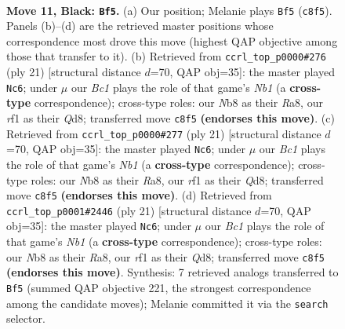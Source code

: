\documentclass[11pt]{article}
\begin{document}
\clearpage

\begin{figure}[p]\centering
\begin{subfigure}{0.46\textwidth}\centering
\resizebox{\linewidth}{!}{%
\newchessgame
\chessboard[
  setfen={rnb2rk1/ppp1bp1p/3q2p1/3pN3/3P3P/6P1/PP2PP2/RNBQ1RK1 b - - 0 11},
  showmover=false,
  pgfstyle=straightmove, color=movearrow, markmove={c8-f5}
]}
\caption{}
\end{subfigure}\hfill
\begin{subfigure}{0.46\textwidth}\centering
\resizebox{\linewidth}{!}{%
\newchessgame
\chessboard[
  setfen={rn1q1rk1/pp2ppbp/6p1/3pNb2/3P1B2/2P3P1/P3PPBP/R2Q1RK1 b - - 0 11},
  showmover=false,
  pgfstyle=straightmove, color=movearrow, markmove={b8-c6}
]}
\caption{}
\end{subfigure}
\\[4pt]
\begin{subfigure}{0.46\textwidth}\centering
\resizebox{\linewidth}{!}{%
\newchessgame
\chessboard[
  setfen={rn1q1rk1/pp2ppbp/6p1/3pNb2/3P1B2/2P3P1/P3PPBP/R2Q1RK1 b - - 0 11},
  showmover=false,
  pgfstyle=straightmove, color=movearrow, markmove={b8-c6}
]}
\caption{}
\end{subfigure}\hfill
\begin{subfigure}{0.46\textwidth}\centering
\resizebox{\linewidth}{!}{%
\newchessgame
\chessboard[
  setfen={rn1q1rk1/pp2ppbp/6p1/3pNb2/3P1B2/2P3P1/P3PPBP/R2Q1RK1 b - - 0 11},
  showmover=false,
  pgfstyle=straightmove, color=movearrow, markmove={b8-c6}
]}
\caption{}
\end{subfigure}
\caption{\textbf{Move 11, Black: \texttt{Bf5}.} (a) Our position; Melanie plays \texttt{Bf5} (\texttt{c8f5}). Panels (b)--(d) are the retrieved master positions whose correspondence most drove this move (highest QAP objective among those that transfer to it). (b) Retrieved from \texttt{ccrl\_top\_p0000\#276} (ply 21) [structural distance $d$=70, QAP obj=35]: the master played \texttt{Nc6}; under $\mu$ our \emph{Bc1} plays the role of that game's \emph{Nb1} (a \textbf{cross-type} correspondence); cross-type roles: our \emph{N}b8 as their \emph{R}a8, our \emph{r}f1 as their \emph{Q}d8; transferred move \texttt{c8f5} \textbf{(endorses this move)}. (c) Retrieved from \texttt{ccrl\_top\_p0000\#277} (ply 21) [structural distance $d$=70, QAP obj=35]: the master played \texttt{Nc6}; under $\mu$ our \emph{Bc1} plays the role of that game's \emph{Nb1} (a \textbf{cross-type} correspondence); cross-type roles: our \emph{N}b8 as their \emph{R}a8, our \emph{r}f1 as their \emph{Q}d8; transferred move \texttt{c8f5} \textbf{(endorses this move)}. (d) Retrieved from \texttt{ccrl\_top\_p0001\#2446} (ply 21) [structural distance $d$=70, QAP obj=35]: the master played \texttt{Nc6}; under $\mu$ our \emph{Bc1} plays the role of that game's \emph{Nb1} (a \textbf{cross-type} correspondence); cross-type roles: our \emph{N}b8 as their \emph{R}a8, our \emph{r}f1 as their \emph{Q}d8; transferred move \texttt{c8f5} \textbf{(endorses this move)}. Synthesis: 7 retrieved analogs transferred to \texttt{Bf5} (summed QAP objective 221, the strongest correspondence among the candidate moves); Melanie committed it via the \texttt{search} selector.}
\label{fig:thought-m21}
\end{figure}
\end{document}
